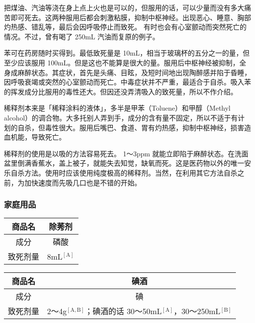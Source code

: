 \documentclass[UTF8]{ctexart}
\begin{document}
把煤油、汽油等浇在身上点上火也是可以的，但服用的话，可以少量而没有多大痛苦即可死去。这两种服用后都会刺激粘膜，抑制中枢神经。出现恶心、睡意、胸部灼热感、错乱等，最后会因呼吸停止而致死。  有时也会有心室颤动而突然死亡的情况。不过，曾有喝了 250mL 汽油而复原的例子。

苯可在药房随时买得到。最低致死量是 10mL，相当于玻璃杯的五分之一的量，但至少应该服用 100mL。但是这也不能算是很大的量。服用后中枢神经被抑制，全身成麻醉状态。其症状，首先是头痛、目眩，及短时间地出现陶醉感并陷于昏睡，因呼吸衰竭或突然的心室颤动而死亡。中毒症状并不严重，最适合于自杀。吸入苯的挥发成分比服用的毒性还大。但因还没弄清吸入的致死量，所以不作介绍。

稀释剂本来是「稀释涂料的液体」，多半是甲苯（Toluene）和甲醇（Methyl alcohol）的调合物。大多托别人弄到手，成分的含有量不固定，所以不适于有计划的自杀，但毒性很大。服用后嘴巴、食道、胃有灼热感，抑制中枢神经，损害造血机能，导致死亡。

稀释剂的使用是以吸的方法容易死去。 1～3ppm 就能立即陷于麻醉状态。在洗面盆里倒满香蕉水，盖上被子，就能失去知觉，缺氧而死。这是医药物以外的唯一安乐自杀方法。使用时应该使用纯度极高的稀释剂。当然，在利用其它方法自杀之前，为加快速度而先吸几口也是不错的开始。

\subsubsection*{家庭用品}

\begin{table}[htbp]
\begin{center}
\begin{tabular}{cc}

\toprule
商品名 & 除莠剂 \\
\midrule
成分 &磷酸 \\
致死剂量 & 8mL$^\mathrm{[A]}$ \\
\bottomrule
\end{tabular}
\end{center}
\end{table}

\begin{table}[htbp]
\begin{center}
\begin{tabular}{cc}

\toprule
商品名 & 碘酒 \\
\midrule
成分 & 碘\\
致死剂量 & 2～4g$^\mathrm{[A,B]}$；碘酒的话 30～50mL$^\mathrm{[A]}$，30～250mL$^\mathrm{[B]}$ \\
\bottomrule
\end{tabular}
\end{center}
\end{table}
\end{document}
